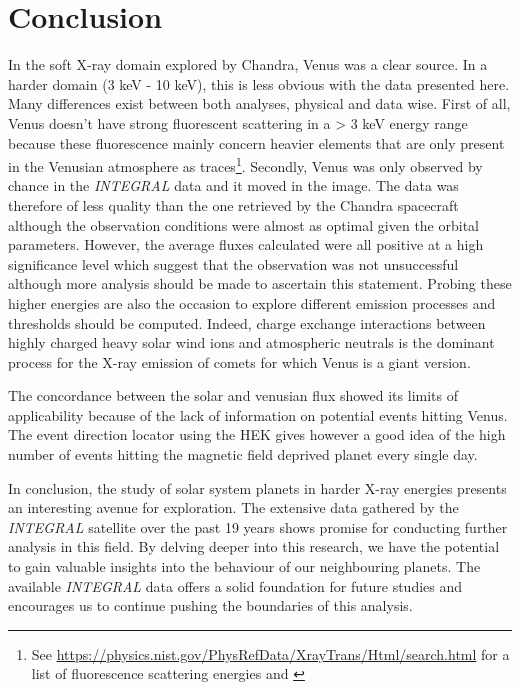\section{Conclusion}

In the soft X-ray domain explored by Chandra, Venus was a clear source. In a harder domain (3 keV - 10 keV), this is less obvious with the data presented here. Many differences exist between both analyses, physical and data wise. First of all, Venus doesn't have strong fluorescent scattering in a > 3 keV energy range because these fluorescence mainly concern heavier elements that are only present in the Venusian atmosphere as traces\footnote{See \url{https://physics.nist.gov/PhysRefData/XrayTrans/Html/search.html} for a list of fluorescence scattering energies and \cite{Futaana2017SolarAtmosphere}}. Secondly, Venus was only observed by chance in the \textit{INTEGRAL} data and it moved in the image. The data was therefore of less quality than the one retrieved by the Chandra spacecraft although the observation conditions were almost as optimal given the orbital parameters. However, the average fluxes calculated were all positive at a high significance level which suggest that the observation was not unsuccessful although more analysis should be made to ascertain this statement. Probing these higher energies are also the occasion to explore different emission processes and thresholds should be computed. Indeed, charge exchange interactions between highly charged heavy solar wind ions and atmospheric neutrals is the dominant process for the X-ray emission of comets for which Venus is a giant version\cite{Futaana2017SolarAtmosphere}.

The concordance between the solar and venusian flux showed its limits of applicability because of the lack of information on potential events hitting Venus. The event direction locator using the HEK gives however a good idea of the high number of events hitting the magnetic field deprived planet every single day.

In conclusion, the study of solar system planets in harder X-ray energies presents an interesting avenue for exploration. The extensive data gathered by the \textit{INTEGRAL} satellite over the past 19 years shows promise for conducting further analysis in this field. By delving deeper into this research, we have the potential to gain valuable insights into the behaviour of our neighbouring planets. The available \textit{INTEGRAL} data offers a solid foundation for future studies and encourages us to continue pushing the boundaries of this analysis.
